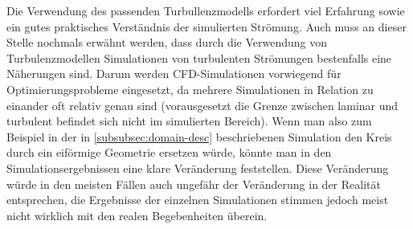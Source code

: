 \begin{refsection}
Die Verwendung des passenden Turbullenzmodells erfordert viel Erfahrung sowie ein gutes 
praktisches Verständnis der simulierten Strömung. Auch muss an dieser Stelle nochmals erwähnt werden,
dass durch die Verwendung von Turbulenzmodellen Simulationen von turbulenten Strömungen bestenfalls eine Näherungen sind.
Darum werden CFD-Simulationen vorwiegend für Optimierungsprobleme eingesetzt, da mehrere Simulationen in Relation zu einander
oft relativ genau sind (vorausgesetzt die Grenze zwischen laminar und turbulent befindet sich nicht im simulierten Bereich).
Wenn man also zum Beispiel in der in \ref{subsubsec:domain-desc} beschriebenen Simulation den Kreis durch ein eiförmige Geometrie
ersetzen würde, könnte man in den Simulationsergebnissen eine klare Veränderung feststellen.
Diese Veränderung würde in den meisten Fällen auch ungefähr der Veränderung in der Realität entsprechen,
die Ergebnisse der einzelnen Simulationen stimmen jedoch meist nicht wirklich mit den realen Begebenheiten überein.


% 
% 
% 

\printbibliography[heading=subbibliography]
\end{refsection}
